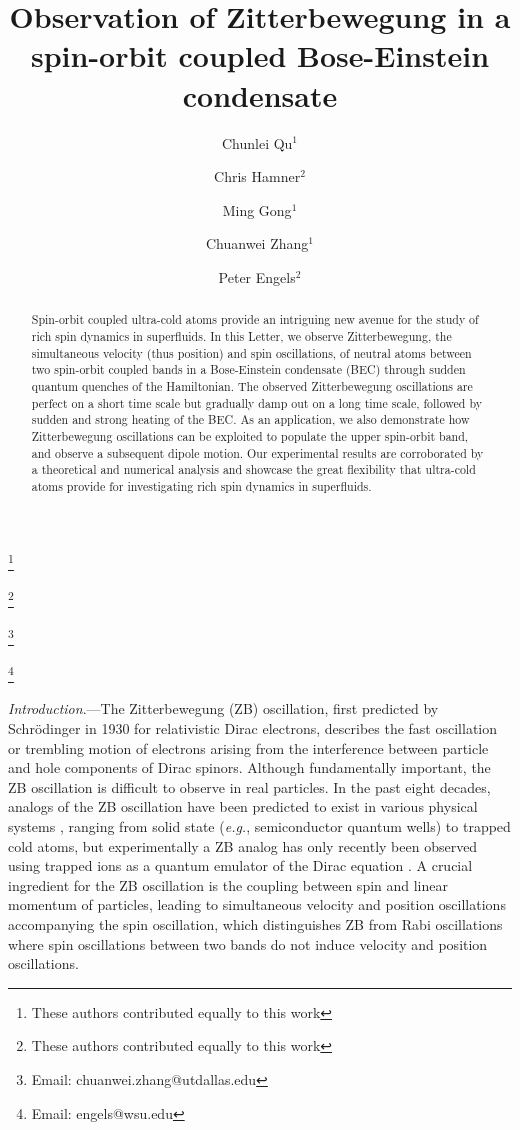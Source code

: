 \documentclass[prl,aps,twocolumn,showpacs,floatfix]{revtex4-1}
\begin{document}
\title{Observation of Zitterbewegung in a spin-orbit coupled Bose-Einstein
condensate}
\author{Chunlei Qu$^{1}$}
\thanks{These authors contributed equally to this work}
\author{Chris Hamner$^{2}$}
\thanks{These authors contributed equally to this work}
\author{Ming Gong$^{1}$}
\author{Chuanwei Zhang$^{1}$}
\thanks{Email: chuanwei.zhang@utdallas.edu}
\author{Peter Engels$^{2}$}
\thanks{Email: engels@wsu.edu}

\begin{abstract}
Spin-orbit coupled ultra-cold atoms provide an intriguing new avenue for the
study of rich spin dynamics in superfluids. In this Letter, we observe
Zitterbewegung, the simultaneous velocity (thus position) and spin
oscillations, of neutral atoms between two spin-orbit coupled bands in a
Bose-Einstein condensate (BEC) through sudden quantum quenches of the
Hamiltonian. The observed Zitterbewegung oscillations are perfect on a short
time scale but gradually damp out on a long time scale, followed by sudden
and strong heating of the BEC. As an application, we also demonstrate how
Zitterbewegung oscillations can be exploited to populate the upper
spin-orbit band, and observe a subsequent dipole motion. Our experimental
results are corroborated by a theoretical and numerical analysis and
showcase the great flexibility that ultra-cold atoms provide for
investigating rich spin dynamics in superfluids.
\end{abstract}

\maketitle

\emph{Introduction}.---The Zitterbewegung (ZB) oscillation, first predicted
by Schr\"{o}dinger in 1930 \cite{ZB1930} for relativistic Dirac electrons,
describes the fast oscillation or trembling motion of electrons arising from
the interference between particle and hole components of Dirac spinors.
Although fundamentally important, the ZB oscillation is difficult to observe
in real particles. In the past eight decades, analogs of the ZB oscillation
have been predicted to exist in various physical systems \cite%
{ZBgraphene,ZBGeim,ZBTI,ZBsemiconductor,ZBatom,ZBdamp,Ions-Solano}, ranging
from solid state (\textit{e.g.}, semiconductor quantum wells) to trapped
cold atoms, but experimentally a ZB analog has only recently been observed
using trapped ions as a quantum emulator of the Dirac equation \cite{ZBexp}.
A crucial ingredient for the ZB oscillation is the coupling between spin and
linear momentum of particles, leading to simultaneous velocity and position
oscillations accompanying the spin oscillation, which distinguishes ZB from
Rabi oscillations where spin oscillations between two bands do not induce
velocity and position oscillations.
\end{document}
